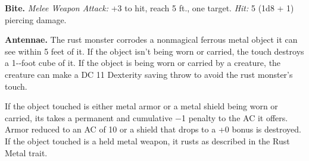 \documentclass[
]{article}
\begin{document}
\textbf{Bite.} \emph{Melee Weapon Attack:} +3 to hit, reach 5 ft., one
target. \emph{Hit:} 5 (1d8 + 1) piercing damage.

\textbf{Antennae.} The rust monster corrodes a nonmagical ferrous metal
object it can see within 5 feet of it. If the object isn't being worn or
carried, the touch destroys a 1-­‐foot cube of it. If the object is
being worn or carried by a creature, the creature can make a DC 11
Dexterity saving throw to avoid the rust monster's touch.

If the object touched is either metal armor or a metal shield being worn
or carried, its takes a permanent and cumulative −1 penalty to the AC it
offers. Armor reduced to an AC of 10 or a shield that drops to a +0
bonus is destroyed. If the object touched is a held metal weapon, it
rusts as described in the Rust Metal trait.
\end{document}
